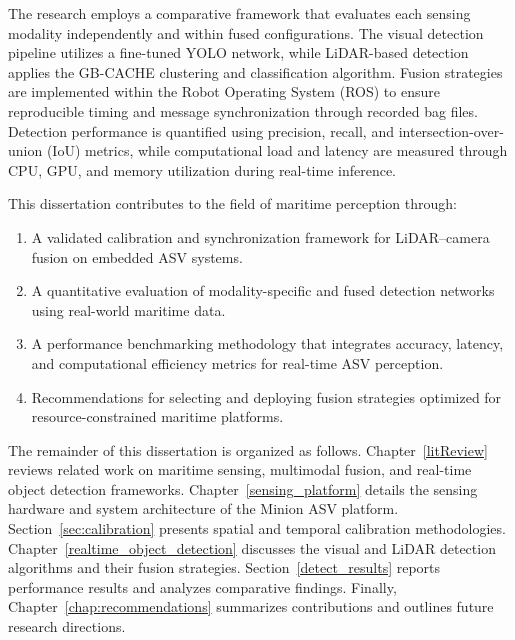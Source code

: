 \documentclass{erauthesis}
\begin{document}
The research employs a comparative framework that evaluates each sensing modality independently and within fused configurations. The visual detection pipeline utilizes a fine-tuned YOLO network, while LiDAR-based detection applies the GB-CACHE clustering and classification algorithm. 
Fusion strategies are implemented within the Robot Operating System (ROS) to ensure reproducible timing and message synchronization through recorded bag files. 
Detection performance is quantified using precision, recall, and intersection-over-union (IoU) metrics, while computational load and latency are measured through CPU, GPU, and memory utilization during real-time inference.

This dissertation contributes to the field of maritime perception through:
\begin{enumerate}
    \item A validated calibration and synchronization framework for LiDAR–camera fusion on embedded ASV systems.
    \item A quantitative evaluation of modality-specific and fused detection networks using real-world maritime data.
    \item A performance benchmarking methodology that integrates accuracy, latency, and computational efficiency metrics for real-time ASV perception.
    \item Recommendations for selecting and deploying fusion strategies optimized for resource-constrained maritime platforms.
\end{enumerate}

The remainder of this dissertation is organized as follows.  
Chapter~\ref{litReview} reviews related work on maritime sensing, multimodal fusion, and real-time object detection frameworks.  
Chapter~\ref{sensing_platform} details the sensing hardware and system architecture of the Minion ASV platform.  
Section~\ref{sec:calibration} presents spatial and temporal calibration methodologies.  
Chapter~\ref{realtime_object_detection} discusses the visual and LiDAR detection algorithms and their fusion strategies.  
Section~\ref{detect_results} reports performance results and analyzes comparative findings.  
Finally, Chapter~\ref{chap:recommendations} summarizes contributions and outlines future research directions.
\end{document}
